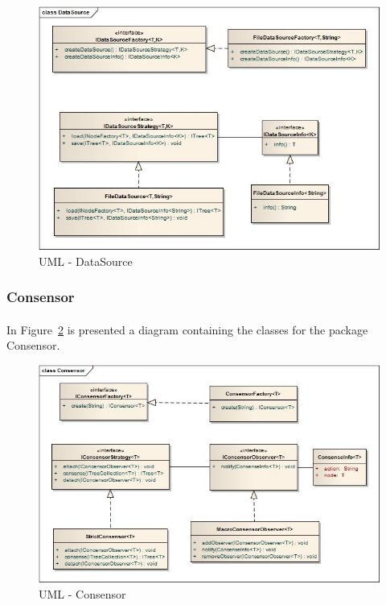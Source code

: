 \documentclass[a4paper,10pt]{article}
\begin{document}
  \begin{figure}
  \centering
  \includegraphics[scale=0.5]{images/DataSource.jpg}  
  \caption{UML - DataSource}
  \label{uml:DataSource}
  \end{figure} 

\subsubsection{Consensor}
\paragraph{}
In Figure~\ref{uml:Consensor} is presented a diagram containing the classes for the package Consensor.

  \begin{figure}
  \centering
  \includegraphics[scale=0.5]{images/Consensor.jpg}  
  \caption{UML - Consensor}
  \label{uml:Consensor}
  \end{figure} 
\end{document}
